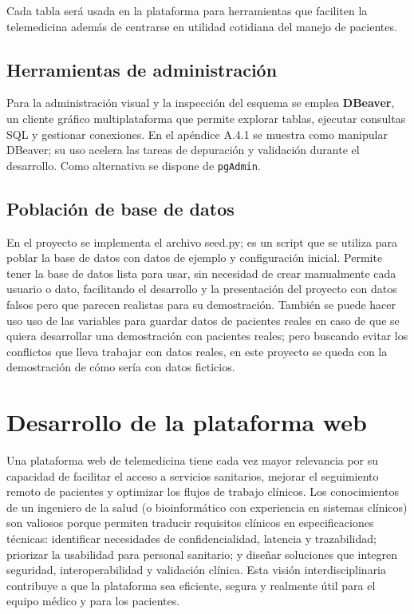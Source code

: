 \documentclass[12pt, a4paper]{article}
\begin{document}
Cada tabla será usada en la plataforma para herramientas que faciliten la telemedicina además de centrarse en utilidad cotidiana del manejo de pacientes.



\subsection{Herramientas de administración}

Para la administración visual y la inspección del esquema se emplea \textbf{DBeaver}, un cliente gráfico multiplataforma que permite explorar tablas, ejecutar consultas SQL y gestionar conexiones. En el apéndice A.4.1 se muestra como manipular DBeaver; su uso acelera las tareas de depuración y validación durante el desarrollo. Como alternativa se dispone de \texttt{pgAdmin}. \cite{dbeaver_doc,postgresql_doc}


\subsection{Población de base de datos}

En el proyecto se implementa el archivo seed.py; es un script que se utiliza para poblar la base de datos con datos de ejemplo y configuración inicial. Permite tener la base de datos lista para usar, sin necesidad de crear manualmente cada usuario o dato, facilitando el desarrollo y la presentación del proyecto con datos falsos pero que parecen realistas para su demostración. También se puede hacer uso uso de las variables para guardar datos de pacientes reales en caso de que se quiera desarrollar una demostración con pacientes reales; pero buscando evitar los conflictos que lleva trabajar con datos reales, en este proyecto se queda con la demostración de cómo sería con datos ficticios.



\section{Desarrollo de la plataforma web}


Una plataforma web de telemedicina tiene cada vez mayor relevancia por su capacidad de facilitar el acceso a servicios sanitarios, mejorar el seguimiento remoto de pacientes y optimizar los flujos de trabajo clínicos. Los conocimientos de un ingeniero de la salud (o bioinformático con experiencia en sistemas clínicos) son valiosos porque permiten traducir requisitos clínicos en especificaciones técnicas: identificar necesidades de confidencialidad, latencia y trazabilidad; priorizar la usabilidad para personal sanitario; y diseñar soluciones que integren seguridad, interoperabilidad y validación clínica. Esta visión interdisciplinaria contribuye a que la plataforma sea eficiente, segura y realmente útil para el equipo médico y para los pacientes.
\end{document}
